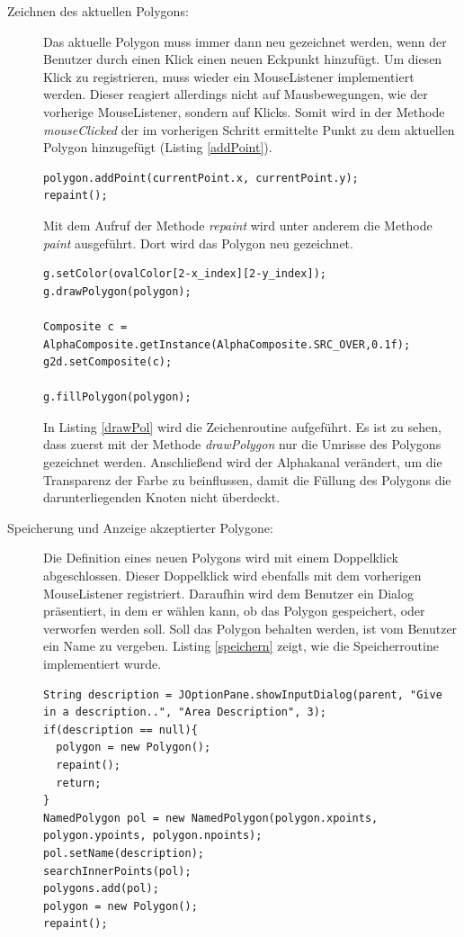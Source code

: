 \begin{description}
\item[Zeichnen des aktuellen Polygons:] Das aktuelle Polygon muss immer dann neu gezeichnet werden, wenn der Benutzer durch einen Klick einen neuen Eckpunkt hinzufügt. Um diesen Klick zu registrieren, muss wieder ein MouseListener implementiert werden. Dieser reagiert allerdings nicht auf Mausbewegungen, wie der vorherige MouseListener, sondern auf Klicks. Somit wird in der Methode \emph{mouseClicked} der im vorherigen Schritt ermittelte Punkt zu dem aktuellen Polygon hinzugefügt (Listing \ref{addPoint}).
\begin{lstlisting}[captionpos=b, caption=Neuen Punkt zum Polygon hinzufügen, label=addPoint]
polygon.addPoint(currentPoint.x, currentPoint.y);
repaint();
\end{lstlisting}

Mit dem Aufruf der Methode \emph{repaint} wird unter anderem die Methode \emph{paint} ausgeführt. Dort wird das Polygon neu gezeichnet.
\begin{lstlisting}[captionpos=b, caption=Zeichnen des Polygons, label=drawPol]
g.setColor(ovalColor[2-x_index][2-y_index]);
g.drawPolygon(polygon);

Composite c = AlphaComposite.getInstance(AlphaComposite.SRC_OVER,0.1f);
g2d.setComposite(c);

g.fillPolygon(polygon);
\end{lstlisting}

In Listing \ref{drawPol} wird die Zeichenroutine aufgeführt. Es ist zu sehen, dass zuerst mit der Methode \emph{drawPolygon} nur die Umrisse des Polygons gezeichnet werden. Anschließend wird der Alphakanal verändert, um die Transparenz der Farbe zu beinflussen, damit die Füllung des Polygons die darunterliegenden Knoten nicht überdeckt.

\item[Speicherung und Anzeige akzeptierter Polygone:] Die Definition eines neuen Polygons wird mit einem Doppelklick abgeschlossen. Dieser Doppelklick wird ebenfalls mit dem vorherigen MouseListener registriert. Daraufhin wird dem Benutzer ein Dialog präsentiert, in dem er wählen kann, ob das Polygon gespeichert, oder verworfen werden soll. Soll das Polygon behalten werden, ist vom Benutzer ein Name zu vergeben. Listing \ref{speichern} zeigt, wie die Speicherroutine implementiert wurde.
\begin{lstlisting}[captionpos=b, caption=Routine zum Speichern eines Polygons, label=speichern]
String description = JOptionPane.showInputDialog(parent, "Give in a description..", "Area Description", 3);
if(description == null){
  polygon = new Polygon();
  repaint();
  return;
}  
NamedPolygon pol = new NamedPolygon(polygon.xpoints, polygon.ypoints, polygon.npoints);
pol.setName(description);
searchInnerPoints(pol);
polygons.add(pol);
polygon = new Polygon();
repaint();
\end{lstlisting}


\end{description}
